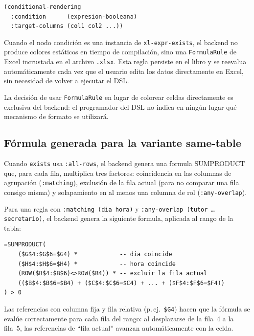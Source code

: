 \documentclass[12pt,a4paper]{report}
\begin{document}
\begin{lstlisting}[language=CommonLisp,
  caption={Sintaxis de conditional-rendering.}]
(conditional-rendering
  :condition      (expresion-booleana)
  :target-columns (col1 col2 ...))
\end{lstlisting}

Cuando el nodo condici\'on es una instancia de \texttt{xl-expr-exists}, el
backend no produce colores est\'aticos en tiempo de compilaci\'on, sino una
\texttt{FormulaRule} de Excel incrustada en el archivo \texttt{.xlsx}.
Esta regla persiste en el libro y se reevalua autom\'aticamente cada vez
que el usuario edita los datos directamente en Excel, sin necesidad de
volver a ejecutar el DSL.

La decisi\'on de usar \texttt{FormulaRule} en lugar de colorear celdas
directamente es exclusiva del backend: el programador del DSL no indica en
ning\'un lugar qu\'e mecanismo de formato se utilizar\'a.

\subsection{F\'ormula generada para la variante same-table}
\label{sec:cf-same-table}

Cuando \texttt{exists} usa \texttt{:all-rows}, el backend genera una formula
SUMPRODUCT que, para cada fila, multiplica tres factores: coincidencia en
las columnas de agrupaci\'on (\texttt{:matching}), exclusi\'on de la fila
actual (para no comparar una fila consigo misma) y solapamiento en al menos
una columna de rol (\texttt{:any-overlap}).

Para una regla con \texttt{:matching (dia hora)} y
\texttt{:any-overlap (tutor \ldots secretario)}, el backend genera la
siguiente formula, aplicada al rango de la tabla:

\begin{lstlisting}[style=pythonstyle,
  caption={Formula Excel CF para la variante same-table (escrita para la fila 4).}]
=SUMPRODUCT(
    ($G$4:$G$6=$G4) *            -- dia coincide
    ($H$4:$H$6=$H4) *            -- hora coincide
    (ROW($B$4:$B$6)<>ROW($B4)) * -- excluir la fila actual
    (($B$4:$B$6=$B4) + ($C$4:$C$6=$C4) + ... + ($F$4:$F$6=$F4))
) > 0
\end{lstlisting}

Las referencias con columna fija y fila relativa (p.\,ej.\ \texttt{\$G4})
hacen que la f\'ormula se eval\'ue correctamente para cada fila del rango:
al desplazarse de la fila~4 a la fila~5, las referencias de ``fila actual''
avanzan autom\'aticamente con la celda.
\end{document}
